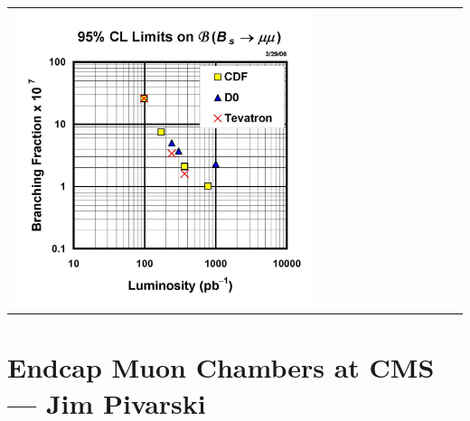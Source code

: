 \documentclass[compress]{beamer}
\begin{document}
\begin{frame}
\begin{tabular}{p{0.68\linewidth} p{0.4\linewidth}}
\begin{minipage}{\linewidth}
    \includegraphics[width=\linewidth]{plots/Bs2mumu_95CL_060323}
  \end{minipage}
\end{tabular}
\end{frame}

\section*{Endcap Muon Chambers at CMS --- Jim Pivarski}
\end{document}
